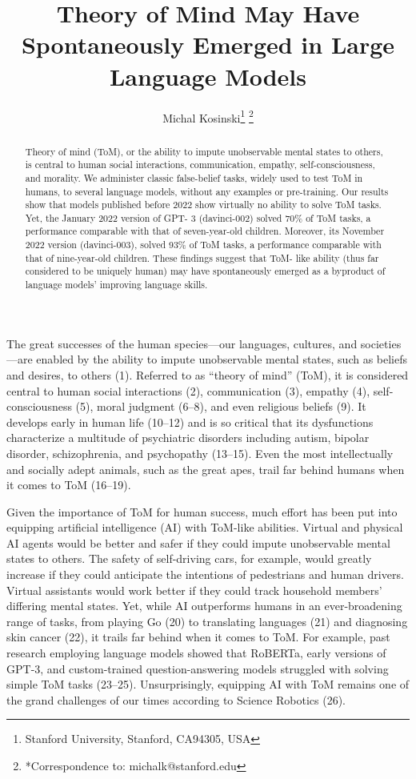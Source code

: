\documentclass[11pt]{article}
\begin{document}
\title{Theory of Mind May Have Spontaneously Emerged in Large Language Models}
\author{Michal Kosinski\footnote{Stanford University, Stanford, CA94305, USA } \footnote{*Correspondence to: michalk@stanford.edu}}
\maketitle
\begin{abstract}
Theory of mind (ToM), or the ability to impute unobservable mental states to others, is central to human social interactions, communication, empathy, self-consciousness, and morality. We administer classic false-belief tasks, widely used to test ToM in humans, to several language models, without any examples or pre-training. Our results show that models published before 2022 show virtually no ability to solve ToM tasks. Yet, the January 2022 version of GPT- 3 (davinci-002) solved 70\% of ToM tasks, a performance comparable with that of seven-year-old children. Moreover, its November 2022 version (davinci-003), solved 93\% of ToM tasks, a performance comparable with that of nine-year-old children. These findings suggest that ToM- like ability (thus far considered to be uniquely human) may have spontaneously emerged as a byproduct of language models’ improving language skills.
\end{abstract}


The great successes of the human species—our languages, cultures, and societies—are enabled by the ability to impute unobservable mental states, such as beliefs and desires, to others (1). Referred to as “theory of mind” (ToM), it is considered central to human social interactions (2), communication (3), empathy (4), self-consciousness (5), moral judgment (6–8), and even religious beliefs (9). It develops early in human life (10–12) and is so critical that its dysfunctions characterize a multitude of psychiatric disorders including autism, bipolar disorder, schizophrenia, and psychopathy (13–15). Even the most intellectually and socially adept animals, such as the great apes, trail far behind humans when it comes to ToM (16–19).

Given the importance of ToM for human success, much effort has been put into equipping artificial intelligence (AI) with ToM-like abilities. Virtual and physical AI agents would be better and safer if they could impute unobservable mental states to others. The safety of self-driving cars, for example, would greatly increase if they could anticipate the intentions of pedestrians and human drivers. Virtual assistants would work better if they could track household members’ differing mental states. Yet, while AI outperforms humans in an ever-broadening range of tasks, from playing Go (20) to translating languages (21) and diagnosing skin cancer (22), it trails far behind when it comes to ToM. For example, past research employing language models showed that RoBERTa, early versions of GPT-3, and custom-trained question-answering models struggled with solving simple ToM tasks (23–25). Unsurprisingly, equipping AI with ToM remains one of the grand challenges of our times according to Science Robotics (26).
\end{document}
